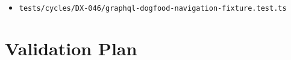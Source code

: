 \begin{itemize}
\item
  \texttt{t\allowbreak{}e\allowbreak{}s\allowbreak{}t\allowbreak{}s\allowbreak{}/\allowbreak{}c\allowbreak{}y\allowbreak{}c\allowbreak{}l\allowbreak{}e\allowbreak{}s\allowbreak{}/\allowbreak{}D\allowbreak{}X\allowbreak{}-\allowbreak{}0\allowbreak{}4\allowbreak{}6\allowbreak{}/\allowbreak{}g\allowbreak{}r\allowbreak{}a\allowbreak{}p\allowbreak{}h\allowbreak{}q\allowbreak{}l\allowbreak{}-\allowbreak{}d\allowbreak{}o\allowbreak{}g\allowbreak{}f\allowbreak{}o\allowbreak{}o\allowbreak{}d\allowbreak{}-\allowbreak{}n\allowbreak{}a\allowbreak{}v\allowbreak{}i\allowbreak{}g\allowbreak{}a\allowbreak{}t\allowbreak{}i\allowbreak{}o\allowbreak{}n\allowbreak{}-\allowbreak{}f\allowbreak{}i\allowbreak{}x\allowbreak{}t\allowbreak{}u\allowbreak{}r\allowbreak{}e\allowbreak{}.\allowbreak{}t\allowbreak{}e\allowbreak{}s\allowbreak{}t\allowbreak{}.\allowbreak{}t\allowbreak{}s}
\end{itemize}

\section{Validation Plan}\label{record-253-validation-plan}

